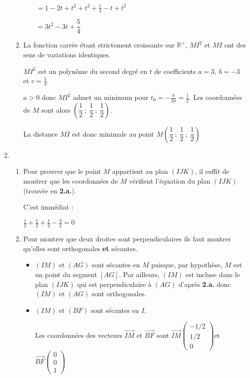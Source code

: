 \begin{corrige}
\begin{enumerate}
\begin{enumerate}[label=\alph*.]
               \par
               $\phantom{MI^2}=1-2t+t^2+t^2+\frac{1}{4}-t +t^2$
               \par
               $\phantom{MI^2}= 3t^2-3t+\dfrac{5}{4}$
               \item
               La fonction carrée étant strictement croissante sur $\mathbb{R}^+$, $MI^2$ et $MI$ ont des sens de variations identiques.
               \par
               $MI^2$ est un polynôme du second degré en $t$ de coefficients $a=3,\ b=-3$ et $c=\frac{5}{4}$.
               \par
               $a>0$ donc $MI^2$ admet un minimum pour $t_0=-\frac{b}{2a}=\frac{1}{2}$. Les coordonnées de $M$ sont alors $\left(\dfrac{1}{2}~;~\dfrac{1}{2}~;~\dfrac{1}{2}\right)$.
               \par
               La distance $MI$ est donc minimale au point $M\left(\dfrac{1}{2}~;~\dfrac{1}{2}~;~\dfrac{1}{2}\right)$
          \end{enumerate}
          \item
          \begin{enumerate}[label=\alph*.]
               \item
               Pour prouver que le point $M$ appartient au plan $(IJK)$, il suffit de montrer que les coordonnées de $M$ vérifient l'équation du plan $(IJK)$ (trouvée en \textbf{2.a.}).
               \par
               C'est immédiat :
               \par
               $\frac{1}{2}+\frac{1}{2}+\frac{1}{2}-\frac{3}{2}=0$
               \item
               Pour montrer que deux droites sont perpendiculaires ils faut montrer qu'elles sont orthogonales \textbf{et} sécantes.
               \begin{itemize}
                    \item
                    $(IM)$ et $(AG)$ sont sécantes en $M$ puisque, par hypothèse, $M$ est un point du segment $[AG]$. Par ailleurs, $(IM)$ est incluse dans le plan $(IJK)$ qui est perpendiculaire à $(AG)$ d'après \textbf{2.a.} donc $(IM)$ et $(AG)$ sont orthogonales.
                    \item
                    $(IM)$ et $(BF)$ sont sécantes en $I$.
                    \par
                    Les coordonnées des vecteurs $\overrightarrow{IM}$ et $\overrightarrow{BF}$ sont $\overrightarrow{IM}\begin{pmatrix} -1/2 \\ 1/2 \\ 0  \end{pmatrix}$et $\overrightarrow{BF}\begin{pmatrix}  0 \\ 0 \\ 1   \end{pmatrix}$

\end{itemize}
\end{enumerate}
\end{enumerate}
\end{corrige}
